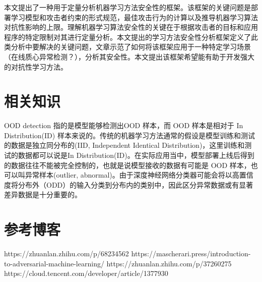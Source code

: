 \documentclass[UTF8]{ctexart}
\begin{document}
	本文提出了一种用于定量分析机器学习方法安全性的框架。该框架的关键问题是部署学习模型和攻击者约束的形式规范，最佳攻击行为的计算以及推导机器学习算法对抗性影响的上限。理解机器学习算法安全性的关键在于根据攻击者的目标和应用程序的特定限制对其进行定量分析。本文提出的学习方法安全性分析框架定义了此类分析中要解决的关键问题，文章示范了如何将该框架应用于一种特定学习场景（在线质心异常检测？），分析其安全性。本文提出该框架希望能有助于开发强大的对抗性学习方法。
	\clearpage
	\section{相关知识}\label{sec:diliujie}
	OOD detection 指的是模型能够检测出OOD 样本，而 OOD 样本是相对于 In Distribution(ID) 样本来说的。传统的机器学习方法通常的假设是模型训练和测试的数据是独立同分布的(IID, Independent Identical Distribution)，这里训练和测试的数据都可以说是In Distribution(ID)。在实际应用当中，模型部署上线后得到的数据往往不能被完全控制的，也就是说模型接收的数据有可能是 OOD 样本，也可以叫异常样本(outlier, abnormal)。由于深度神经网络分类器可能会将以高置信度将分布外（ODD）的输入分类到分布内的类别中，因此区分异常数据或有显著差异数据是十分重要的。
	\clearpage
	\section{参考博客}\label{sec:diqijie}
	https://zhuanlan.zhihu.com/p/68234562
	https://mascherari.press/introduction-to-adversarial-machine-learning/
	https://zhuanlan.zhihu.com/p/37260275
	https://cloud.tencent.com/developer/article/1377930
	\clearpage
	
\end{document}

